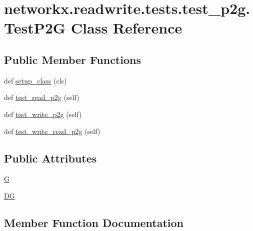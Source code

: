 \hypertarget{classnetworkx_1_1readwrite_1_1tests_1_1test__p2g_1_1TestP2G}{}\section{networkx.\+readwrite.\+tests.\+test\+\_\+p2g.\+Test\+P2G Class Reference}
\label{classnetworkx_1_1readwrite_1_1tests_1_1test__p2g_1_1TestP2G}
\subsection*{Public Member Functions}
\begin{DoxyCompactItemize}
\item 
def \hyperlink{classnetworkx_1_1readwrite_1_1tests_1_1test__p2g_1_1TestP2G_ad0a5c883c0e1cb8b0549c5babbcfcf3a}{setup\+\_\+class} (cls)
\item 
def \hyperlink{classnetworkx_1_1readwrite_1_1tests_1_1test__p2g_1_1TestP2G_a10c17040231a96f31aa417dbad14cc5a}{test\+\_\+read\+\_\+p2g} (self)
\item 
def \hyperlink{classnetworkx_1_1readwrite_1_1tests_1_1test__p2g_1_1TestP2G_a8a6261ef35c2e04ef6c6d2ca2b213f00}{test\+\_\+write\+\_\+p2g} (self)
\item 
def \hyperlink{classnetworkx_1_1readwrite_1_1tests_1_1test__p2g_1_1TestP2G_aec566c3e6f0e89fd327062c160ae55f8}{test\+\_\+write\+\_\+read\+\_\+p2g} (self)
\end{DoxyCompactItemize}
\subsection*{Public Attributes}
\begin{DoxyCompactItemize}
\item 
\hyperlink{classnetworkx_1_1readwrite_1_1tests_1_1test__p2g_1_1TestP2G_a38beccef93b709ef8b017b06c990a198}{G}
\item 
\hyperlink{classnetworkx_1_1readwrite_1_1tests_1_1test__p2g_1_1TestP2G_a7807a6268519a5fb86fa6f96accf13c1}{DG}
\end{DoxyCompactItemize}


\subsection{Member Function Documentation}
\mbox{\label{classnetworkx_1_1readwrite_1_1tests_1_1test__p2g_1_1TestP2G_ad0a5c883c0e1cb8b0549c5babbcfcf3a}} 
